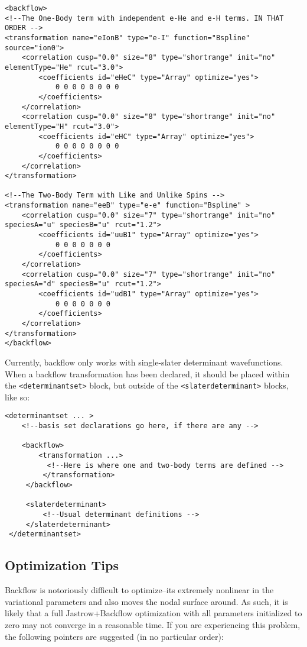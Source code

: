 \begin{lstlisting}[style=XML]
<backflow>
<!--The One-Body term with independent e-He and e-H terms. IN THAT ORDER -->
<transformation name="eIonB" type="e-I" function="Bspline" source="ion0">
    <correlation cusp="0.0" size="8" type="shortrange" init="no" elementType="He" rcut="3.0">
        <coefficients id="eHeC" type="Array" optimize="yes"> 
            0 0 0 0 0 0 0 0
        </coefficients>
    </correlation>
    <correlation cusp="0.0" size="8" type="shortrange" init="no" elementType="H" rcut="3.0">
        <coefficients id="eHC" type="Array" optimize="yes"> 
            0 0 0 0 0 0 0 0
        </coefficients>
    </correlation>
</transformation>

<!--The Two-Body Term with Like and Unlike Spins -->
<transformation name="eeB" type="e-e" function="Bspline" >
    <correlation cusp="0.0" size="7" type="shortrange" init="no" speciesA="u" speciesB="u" rcut="1.2">
        <coefficients id="uuB1" type="Array" optimize="yes"> 
            0 0 0 0 0 0 0
        </coefficients>
    </correlation>
    <correlation cusp="0.0" size="7" type="shortrange" init="no" speciesA="d" speciesB="u" rcut="1.2">
        <coefficients id="udB1" type="Array" optimize="yes"> 
            0 0 0 0 0 0 0
        </coefficients>
    </correlation>
</transformation>
</backflow>
\end{lstlisting}  

Currently, backflow only works with single-slater determinant wavefunctions.  When a backflow transformation has been declared, it should be placed within the \texttt{<determinantset>} block, but outside of the \texttt{<slaterdeterminant>} blocks, like so:

\begin{lstlisting}[style=XML]
<determinantset ... >
    <!--basis set declarations go here, if there are any -->
    
    <backflow>
        <transformation ...>
          <!--Here is where one and two-body terms are defined -->
         </transformation>
     </backflow>
     
     <slaterdeterminant>
         <!--Usual determinant definitions -->
     </slaterdeterminant>
 </determinantset>
\end{lstlisting}

\subsection{Optimization Tips}
Backflow is notoriously difficult to optimize--its extremely nonlinear in the variational parameters and also moves the nodal surface around.  As such, it is likely that a full Jastrow+Backflow optimization with all parameters initialized to zero may not converge in a reasonable time.  If you are experiencing this problem, the following pointers are suggested (in no particular order):

